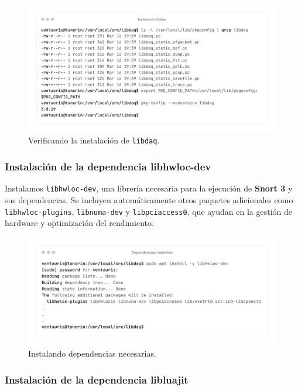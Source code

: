 \documentclass[11pt,a4paper,twoside]{report}
\begin{document}
\begin{figure}[H]
	\centering
	\includegraphics[scale=0.12]{instalacion_snort/14-14.png}
	\caption{Verificando la instalación de \texttt{libdaq}.}
\end{figure}

\newpage

\subsubsection*{Instalación de la dependencia libhwloc-dev}

Instalamos \texttt{libhwloc-dev}, una librería necesaria para la ejecución de \textbf{Snort 3} y sus dependencias. Se incluyen automáticamente otros paquetes adicionales como \texttt{libhwloc-plugins}, \texttt{libnuma-dev} y \texttt{libpciaccess0}, que ayudan en la gestión de hardware y optimización del rendimiento.

\begin{figure}[H]
	\centering
	\includegraphics[scale=0.12]{instalacion_snort/15-15.png}
	\caption{Instalando dependencias necesarias.}
\end{figure}

\subsubsection*{Instalación de la dependencia libluajit}
\end{document}

